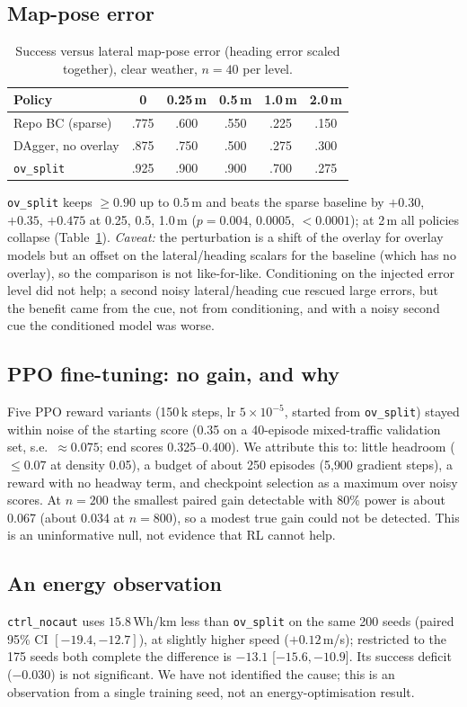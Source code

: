 \documentclass[conference]{IEEEtran}
\newcommand{\ovs}{\texttt{ov\_split}}
\newcommand{\ctrl}{\texttt{ctrl\_nocaut}}
\begin{document}
\subsection{Map-pose error}\label{sec:loc}
\begin{table}[t]
\caption{Success versus lateral map-pose error (heading error scaled together), clear weather, $n{=}40$ per level.}
\label{tab:loc}
\centering\small
\setlength{\tabcolsep}{3pt}
\begin{tabular}{lccccc}
\toprule
Policy & 0 & 0.25\,m & 0.5\,m & 1.0\,m & 2.0\,m\\
\midrule
Repo BC (sparse) & .775 & .600 & .550 & .225 & .150\\
DAgger, no overlay & .875 & .750 & .500 & .275 & .300\\
\ovs & .925 & .900 & .900 & .700 & .275\\
\bottomrule
\end{tabular}
\end{table}
\ovs{} keeps $\ge0.90$ up to 0.5\,m and beats the sparse baseline by $+0.30$, $+0.35$, $+0.475$ at 0.25, 0.5, 1.0\,m ($p=0.004$, $0.0005$, $<0.0001$); at 2\,m all policies collapse (Table~\ref{tab:loc}). \emph{Caveat:} the perturbation is a shift of the overlay for overlay models but an offset on the lateral/heading scalars for the baseline (which has no overlay), so the comparison is not like-for-like. Conditioning on the injected error level did not help; a second noisy lateral/heading cue rescued large errors, but the benefit came from the cue, not from conditioning, and with a noisy second cue the conditioned model was worse.

\subsection{PPO fine-tuning: no gain, and why}\label{sec:ppo}
Five PPO reward variants (150\,k steps, lr $5{\times}10^{-5}$, started from \ovs) stayed within noise of the starting score (0.35 on a 40-episode mixed-traffic validation set, s.e.\ $\approx0.075$; end scores 0.325--0.400). We attribute this to: little headroom ($\le0.07$ at density 0.05), a budget of about 250 episodes (5{,}900 gradient steps), a reward with no headway term, and checkpoint selection as a maximum over noisy scores. At $n{=}200$ the smallest paired gain detectable with 80\% power is about 0.067 (about 0.034 at $n{=}800$), so a modest true gain could not be detected. This is an uninformative null, not evidence that RL cannot help.

\subsection{An energy observation}
\ctrl{} uses $15.8$\,Wh/km less than \ovs{} on the same 200 seeds (paired 95\% CI $[-19.4,-12.7]$), at slightly higher speed ($+0.12$\,m/s); restricted to the 175 seeds both complete the difference is $-13.1$ [$-15.6,-10.9$]. Its success deficit ($-0.030$) is not significant. We have not identified the cause; this is an observation from a single training seed, not an energy-optimisation result.
\end{document}
